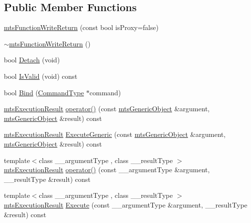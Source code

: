 \subsection*{Public Member Functions}
\begin{DoxyCompactItemize}
\item 
\hyperlink{classmts_function_write_return_a888e54e6998747c0a9d960da550d9be8}{mts\+Function\+Write\+Return} (const bool is\+Proxy=false)
\item 
\hyperlink{classmts_function_write_return_aa5acc0af80061ee2b861b90f55f5f359}{$\sim$mts\+Function\+Write\+Return} ()
\item 
bool \hyperlink{classmts_function_write_return_ae89669a12aeb0cb18ca3b7dc868f5684}{Detach} (void)
\item 
bool \hyperlink{classmts_function_write_return_acd8201536236c23b5b1a5290d801018a}{Is\+Valid} (void) const 
\item 
bool \hyperlink{classmts_function_write_return_ae25c9ce73fdb2c24d6cba15ee788e02c}{Bind} (\hyperlink{classmts_function_write_return_ac896d3571d680531a898daf398774881}{Command\+Type} $\ast$command)
\item 
\hyperlink{classmts_execution_result}{mts\+Execution\+Result} \hyperlink{classmts_function_write_return_ac4775bc92af01d5f4b505f17a8999c51}{operator()} (const \hyperlink{classmts_generic_object}{mts\+Generic\+Object} \&argument, \hyperlink{classmts_generic_object}{mts\+Generic\+Object} \&result) const 
\item 
\hyperlink{classmts_execution_result}{mts\+Execution\+Result} \hyperlink{classmts_function_write_return_af37cce99779df86483046110eb1eb79b}{Execute\+Generic} (const \hyperlink{classmts_generic_object}{mts\+Generic\+Object} \&argument, \hyperlink{classmts_generic_object}{mts\+Generic\+Object} \&result) const 
\item 
{\footnotesize template$<$class \+\_\+\+\_\+argument\+Type , class \+\_\+\+\_\+result\+Type $>$ }\\\hyperlink{classmts_execution_result}{mts\+Execution\+Result} \hyperlink{classmts_function_write_return_a7a80a6d3411e8e3197f91a18ee4d28bb}{operator()} (const \+\_\+\+\_\+argument\+Type \&argument, \+\_\+\+\_\+result\+Type \&result) const 
\item 
{\footnotesize template$<$class \+\_\+\+\_\+argument\+Type , class \+\_\+\+\_\+result\+Type $>$ }\\\hyperlink{classmts_execution_result}{mts\+Execution\+Result} \hyperlink{classmts_function_write_return_a419c077434c89d092ea58e1ff8671284}{Execute} (const \+\_\+\+\_\+argument\+Type \&argument, \+\_\+\+\_\+result\+Type \&result) const 

\end{DoxyCompactItemize}
